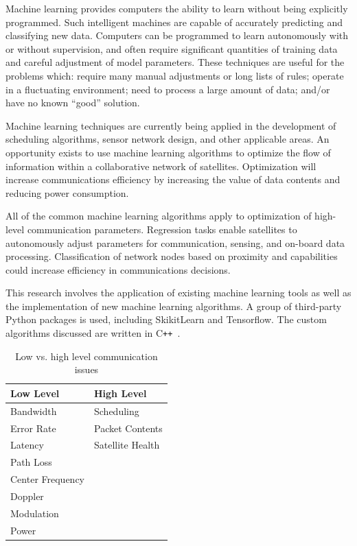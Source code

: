 \documentclass[conference]{IEEEtran}
\newcommand{\cpp}{C\texttt{++}~}
\begin{document}
Machine learning provides computers the ability to learn without being
explicitly programmed.  Such intelligent machines are capable of accurately
predicting and classifying new data.  Computers can be programmed to learn
autonomously with or without supervision, and often require significant
quantities of training data and careful adjustment of model parameters.  These
techniques are useful for the problems which: require many manual adjustments or
long lists of rules; operate in a fluctuating environment; need to process a
large amount of data; and/or have no known ``good'' solution.

Machine learning techniques are currently being applied in the development of
scheduling algorithms, sensor network design, and other applicable areas.  An
opportunity exists to use machine learning algorithms to optimize the flow of
information within a collaborative network of satellites.  Optimization will
increase communications efficiency by increasing the value of data contents and
reducing power consumption.

All of the common machine learning algorithms apply to optimization of
high-level communication parameters.  Regression tasks enable satellites to
autonomously adjust parameters for communication, sensing, and on-board data
processing.  Classification of network nodes based on proximity and capabilities
could increase efficiency in communications decisions.

This research involves the application of existing machine learning tools as
well as the implementation of new machine learning algorithms.  A group of
third-party Python packages is used, including SkikitLearn and Tensorflow.  The
custom algorithms discussed are written in \cpp.

\begin{table}[t]
  \caption{Low vs. high level communication issues}
  \begin{center}
    \begin{tabular}{|l|l|}
      \hline
      \textbf{Low Level} & \textbf{High Level}\\
      \hline
      Bandwidth & Scheduling\\
      \hline
      Error Rate & Packet Contents\\
      \hline
      Latency & Satellite Health\\
      \hline
      Path Loss & \\
      \hline
      Center Frequency & \\
      \hline
      Doppler & \\
      \hline
      Modulation & \\
      \hline
      Power & \\
      \hline
    \end{tabular}
    \label{tab:commlevels}
  \end{center}
\end{table}
\end{document}
